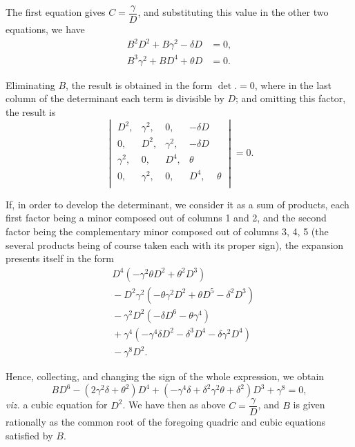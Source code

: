 \documentclass[11pt]{article}
\begin{document}
The first equation gives $C = \dfrac{\gamma}{D}$, and substituting this value in the other two
equations, we have
\begin{align*}
  B^{2} D^{2} + B \gamma^{2} - \delta D &= 0,\\
  B^{3} \gamma^{2} + B D^{4} + \theta D &= 0.
\end{align*}

Eliminating $B$, the result is obtained in the form $\det. = 0$, where in the last
column of the determinant each term is divisible by $D$; and omitting this factor,
the result is
\[
  \begin{vmatrix}
    D^{2}, & \gamma^{2}, & 0, & -\delta D & \\
    0, & D^{2}, & \gamma^{2}, & -\delta D & \\
    \gamma^{2}, & 0, & D^{4}, & \theta & \\
    0, & \gamma^{2}, & 0, & D^{4}, & \theta \\
  \end{vmatrix} = 0.
\]

If, in order to develop the determinant, we consider it as a sum of products,
each first factor being a minor composed out of columns 1 and 2, and the second
factor being the complementary minor composed out of columns 3, 4, 5 (the several
products being of course taken each with its proper sign), the expansion presents
itself in the form
\begin{align*}
  & D^{4}(-\gamma^{2} \theta D^{2} + \theta^{2} D^{3})\\
  & {} - D^{2} \gamma^{2}(- \theta \gamma^{2} D^{2} + \theta D^{5} - \delta^{2} D^{3})\\
  & {} - \gamma^{2} D^{2}(- \delta D^{6} - \theta \gamma^{4})\\
  & {} + \gamma^{4}(- \gamma^{4} \delta D^{2} - \delta^{3} D^{4} - \delta \gamma^{2} D^{4})\\
  & {} - \gamma^{8} D^{2}.
\end{align*}

Hence, collecting, and changing the sign of the whole expression, we obtain
\[
  B D^{6} - (2 \gamma^{2} \delta + \theta^{2}) D^{4} + (-\gamma^{4} \delta + \delta^{2}\gamma^{2}\theta + \delta^{2}) D^{3} + \gamma^{8} = 0,
\]
\emph{viz.} a cubic equation for $D^{2}$.
We have then as above $C = \dfrac{\gamma}{D}$, and $B$ is given rationally
as the common root of the foregoing quadric and cubic equations satisfied by $B$.
\end{document}
